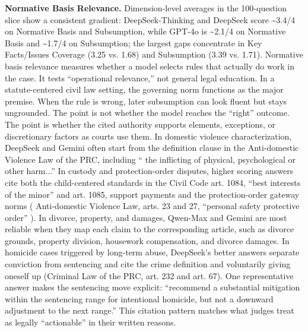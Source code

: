 \textbf{Normative Basis Relevance.} Dimension-level averages in the 100-question slice show a consistent gradient: DeepSeek‑Thinking and DeepSeek score \textasciitilde3.4/4 on Normative Basis and Subsumption, while GPT‑4o is \textasciitilde2.1/4 on Normative Basis and \textasciitilde1.7/4 on Subsumption; the largest gaps concentrate in Key Facts/Issues Coverage (3.25 vs. 1.68) and Subsumption (3.39 vs. 1.71). Normative basis relevance measures whether a model selects rules that actually do work in the case. It tests ``operational relevance,'' not general legal education. In a statute-centered civil law setting, the governing norm functions as the major premise. When the rule is wrong, later subsumption can look fluent but stays ungrounded. The point is not whether the model reaches the ``right'' outcome. The point is whether the cited authority supports elements, exceptions, or discretionary factors as courts use them. In domestic violence characterization, DeepSeek and Gemini often start from the definition clause in the Anti-domestic Violence Law of the PRC, including `` the inflicting of physical, psychological or other harm...'' In custody and protection-order disputes, higher scoring answers cite both the child-centered standards in the Civil Code art. 1084, ``best interests of the minor'' and art. 1085, support payments and the protection-order gateway norms ( Anti-domestic Violence Law, arts. 23 and 27, ``personal safety protective order'' ). In divorce, property, and damages, Qwen-Max and Gemini are most reliable when they map each claim to the corresponding article, such as divorce grounds, property division, housework compensation, and divorce damages. In homicide cases triggered by long-term abuse, DeepSeek's better answers separate conviction from sentencing and cite the crime definition and voluntarily giving oneself up (Criminal Law of the PRC, art. 232 and art. 67). One representative answer makes the sentencing move explicit: ``recommend a substantial mitigation within the sentencing range for intentional homicide, but not a downward adjustment to the next range.'' This citation pattern matches what judges treat as legally ``actionable'' in their written reasons.

